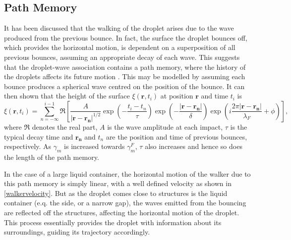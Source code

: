 \documentclass[11pt]{article}
\begin{document}
\subsection{Path Memory}
\label{secpathmemory}

It has been discussed that the walking of the droplet arises due to the wave produced from the previous bounce.  In fact, the surface the droplet bounces off, which provides the horizontal motion, is dependent on a superposition of all previous bounces, assuming an appropriate decay of each wave.  This suggests that the droplet-wave association contains a path memory, where the history of the droplets affects its future motion \cite{8}.  This may be modelled by assuming each bounce produces a spherical wave centred on the position of the bounce.  It can then shown that the height of the surface $\xi(\bm{r},t_i)$ at position $\bm{r}$ and time $t_i$ is
\begin{equation}
    \label{pathmemory}
    \xi(\bm{r},t_i)= \sum_{n=-\infty}^{i-1}\Re\left[\frac{A}{\left|\bm{r}-\bm{r_n}\right|^{1/2}}\exp\left(-\frac{t_i-t_n}{\tau}\right)\exp\left(-\frac{\left|\bm{r}-\bm{r_n}\right|}{\delta}\right)\exp\left(i\frac{2\pi\left|\bm{r}-\bm{r_n}\right|}{\lambda_F}+\phi\right)\right],
\end{equation}
where $\Re$ denotes the real part, $A$ is the wave amplitude at each impact, $\tau$ is the typical decay time and $\bm{r_n}$ and $t_n$ are the position and time of previous bounces, respectively.  As $\gamma_m$ is increased towards $\gamma_m^F$, $\tau$ also increases and hence so does the length of the path memory.

In the case of a large liquid container, the horizontal motion of the walker due to this path memory is simply linear, with a well defined velocity as shown in \eqref{walkervelocity}.  But as the droplet comes close to structures is the liquid container (e.q. the side, or a narrow gap), the waves emitted from the bouncing are reflected off the structures, affecting the horizontal motion of the droplet.  This process essentially provides the droplet with information about its surroundings, guiding its trajectory accordingly.
\end{document}
